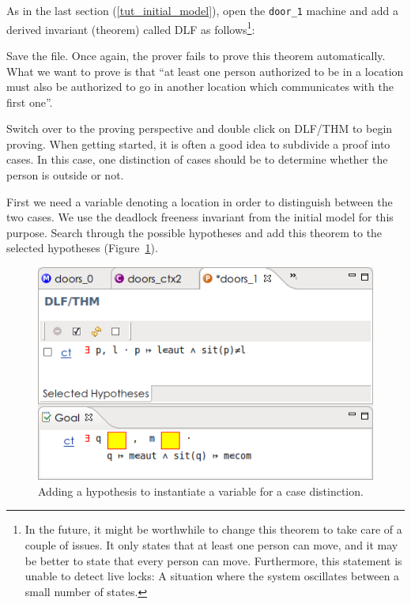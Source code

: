 
As in the last section (\ref{tut_initial_model}), open the \texttt{door\_1} machine and add a derived invariant (theorem) called \textsf{DLF} as follows\footnote{In the future, it might be worthwhile to change this theorem to take care of a couple of issues. It only states that at least one person can move, and it may be better to state that every person can move.  Furthermore, this statement is unable to detect live locks: A situation where the system oscillates between a small number of states.}: 


Save the file. Once again, the prover fails to prove this theorem automatically. What we want to prove is that ``at least one person authorized to be in a location must also be authorized to go in another location which communicates with the first one''.

Switch over to the proving perspective and double click on \textsf{DLF/THM} to begin proving. When getting started, it is often a good idea to subdivide a proof into cases.  In this case, one distinction of cases should be to determine whether the person is outside or not.  

First we need a variable denoting a location in order to distinguish between the two cases. We use the deadlock freeness invariant from the initial model for this purpose. Search through the possible hypotheses and add this theorem to the selected hypotheses (Figure~\ref{tut_10_ref_proof1}).

\begin{figure}[!ht]
\begin{center}
	\includegraphics[]{img/tutorial/tut_10_ref_proof1.png}
	\caption{Adding a hypothesis to instantiate a variable for a case distinction.}
	\label{tut_10_ref_proof1}
\end{center}
\end{figure}

